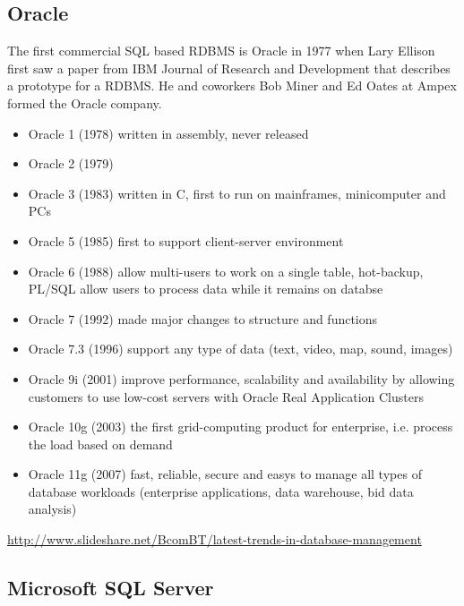\subsection{Oracle}
The first commercial SQL based RDBMS is Oracle in 1977 when Lary Ellison first
saw a paper from IBM Journal of Research and Development that describes a
prototype for a RDBMS. He and coworkers Bob Miner and Ed Oates at Ampex formed
the Oracle company.
\begin{itemize}
  \item Oracle 1 (1978) written in assembly, never released
  \item Oracle 2 (1979)
  \item Oracle 3 (1983) written in C, first to run on mainframes, minicomputer
  and PCs
  \item Oracle 5 (1985) first to support client-server environment
  \item Oracle 6 (1988) allow multi-users to work on a single table, hot-backup,
  PL/SQL allow users to process data while it remains on databse
  
  \item Oracle 7 (1992) made major changes to structure and functions
  
  \item Oracle 7.3 (1996) support any type of data (text, video, map, sound,
  images)
  
  \item Oracle 9i (2001) improve performance, scalability and availability by
  allowing customers to use low-cost servers with Oracle Real Application
  Clusters
  
  \item Oracle 10g (2003) the first grid-computing product for enterprise, i.e.
  process the load based on demand
  
  \item Oracle 11g (2007) fast, reliable, secure and easys to manage all types
  of database workloads (enterprise applications, data warehouse, bid data
  analysis)
\end{itemize}
\url{http://www.slideshare.net/BcomBT/latest-trends-in-database-management}

\subsection{Microsoft SQL Server}

